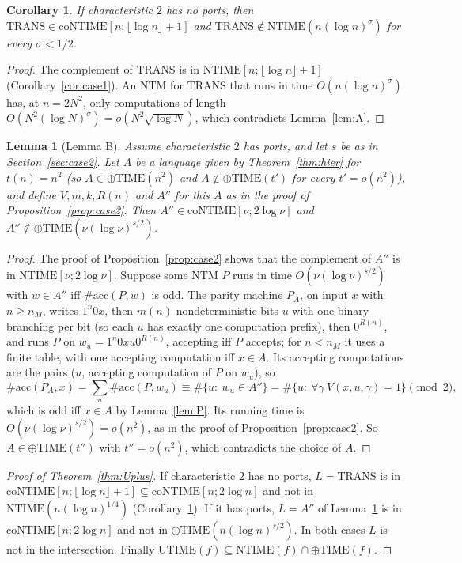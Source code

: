 \documentclass[11pt]{article}
\newtheorem{lemma}[theorem]{Lemma}
\newtheorem{corollary}[theorem]{Corollary}
\theoremstyle{definition}
\theoremstyle{remark}
\newcommand{\NTIME}{\mathrm{NTIME}}
\newcommand{\coNTIME}{\mathrm{coNTIME}}
\newcommand{\parTIME}{\oplus\mathrm{TIME}}
\newcommand{\TRANS}{\mathrm{TRANS}}
\newcommand{\acc}{\#\mathrm{acc}}
\begin{document}
\begin{corollary}\label{cor:A}
If characteristic $2$ has no ports, then $\TRANS\in\coNTIME[n;\lfloor\log n\rfloor+1]$ and $\TRANS\notin\NTIME(n(\log n)^{\sigma})$ for every
$\sigma<1/2$.
\end{corollary}
\begin{proof}
The complement of $\TRANS$ is in $\NTIME[n;\lfloor\log n\rfloor+1]$ (Corollary~\ref{cor:case1}). An NTM for $\TRANS$ that runs in time
$O(n(\log n)^{\sigma})$ has, at $n=2N^2$, only computations of length $O(N^2(\log N)^{\sigma})=o(N^2\sqrt{\log N})$, which
contradicts Lemma~\ref{lem:A}.
\end{proof}

\begin{lemma}[Lemma B]\label{lem:B}
Assume characteristic $2$ has ports, and let $s$ be as in Section~\ref{sec:case2}. Let $A$ be a language given by
Theorem~\ref{thm:hier} for $t(n)=n^2$ (so $A\in\parTIME(n^2)$ and $A\notin\parTIME(t')$ for every $t'=o(n^2)$), and define
$V,m,k,R(n)$ and $A''$ for this $A$ as in the proof of Proposition~\ref{prop:case2}. Then $A''\in\coNTIME[\nu;2\log\nu]$ and
$A''\notin\parTIME(\nu(\log\nu)^{s/2})$.
\end{lemma}
\begin{proof}
The proof of Proposition~\ref{prop:case2} shows that the complement of $A''$ is in $\NTIME[\nu;2\log\nu]$. Suppose some NTM $P$
runs in time $O(\nu(\log\nu)^{s/2})$ with $w\in A''$ iff $\acc(P,w)$ is odd. The parity machine $P_A$, on input $x$ with $n\ge n_M$, writes $1^n0x$, then $m(n)$ nondeterministic bits $u$ with one binary
branching per bit (so each $u$ has exactly one computation prefix), then $0^{R(n)}$, and runs $P$ on $w_u=1^n0xu0^{R(n)}$, accepting iff
$P$ accepts; for $n<n_M$ it uses a finite table, with one accepting computation iff $x\in A$. Its accepting computations are the pairs
($u$, accepting computation of $P$ on $w_u$), so
\[
 \acc(P_A,x)=\sum_u\acc(P,w_u)\equiv\#\{u:\ w_u\in A''\}=\#\{u:\ \forall\gamma\ V(x,u,\gamma)=1\}\pmod2,
\]
which is odd iff $x\in A$ by Lemma~\ref{lem:P}. Its running time is $O(\nu(\log\nu)^{s/2})=o(n^2)$, as in the proof of
Proposition~\ref{prop:case2}. So $A\in\parTIME(t'')$ with $t''=o(n^2)$, which contradicts the choice of $A$.
\end{proof}

\begin{proof}[Proof of Theorem~\ref{thm:Uplus}]
If characteristic $2$ has no ports, $L=\TRANS$ is in $\coNTIME[n;\lfloor\log n\rfloor+1]\subseteq\coNTIME[n;2\log n]$ and not in
$\NTIME(n(\log n)^{1/4})$ (Corollary~\ref{cor:A}). If it has ports, $L=A''$ of Lemma~\ref{lem:B} is in $\coNTIME[n;2\log n]$ and not in
$\parTIME(n(\log n)^{s/2})$. In both cases $L$ is not in the intersection. Finally
$\mathrm{UTIME}(f)\subseteq\NTIME(f)\cap\parTIME(f)$.
\end{proof}
\end{document}
